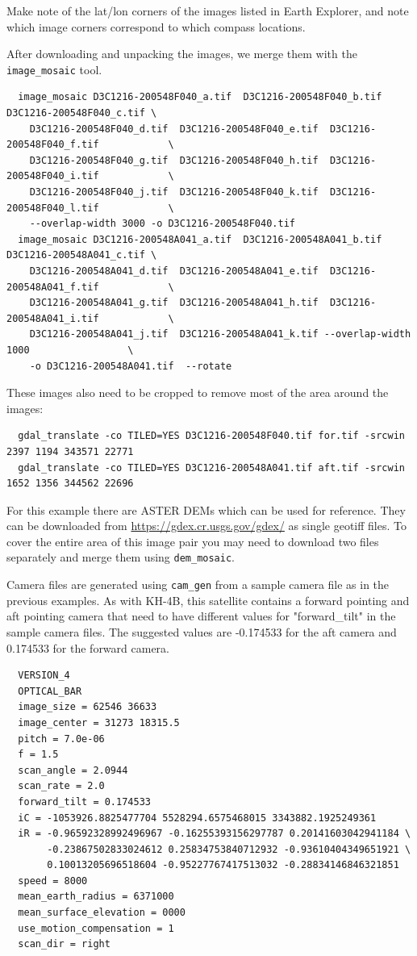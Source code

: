 Make note of the lat/lon corners of the images listed in Earth Explorer, and note which
image corners correspond to which compass locations.

After downloading and unpacking the images, we merge them with the \texttt{image\_mosaic} tool.

\begin{verbatim}
  image_mosaic D3C1216-200548F040_a.tif  D3C1216-200548F040_b.tif  D3C1216-200548F040_c.tif \
    D3C1216-200548F040_d.tif  D3C1216-200548F040_e.tif  D3C1216-200548F040_f.tif            \
    D3C1216-200548F040_g.tif  D3C1216-200548F040_h.tif  D3C1216-200548F040_i.tif            \
    D3C1216-200548F040_j.tif  D3C1216-200548F040_k.tif  D3C1216-200548F040_l.tif            \
    --overlap-width 3000 -o D3C1216-200548F040.tif
  image_mosaic D3C1216-200548A041_a.tif  D3C1216-200548A041_b.tif  D3C1216-200548A041_c.tif \
    D3C1216-200548A041_d.tif  D3C1216-200548A041_e.tif  D3C1216-200548A041_f.tif            \
    D3C1216-200548A041_g.tif  D3C1216-200548A041_h.tif  D3C1216-200548A041_i.tif            \
    D3C1216-200548A041_j.tif  D3C1216-200548A041_k.tif --overlap-width 1000                 \
    -o D3C1216-200548A041.tif  --rotate
\end{verbatim}

These images also need to be cropped to remove most of the area around the images:

\begin{verbatim}
  gdal_translate -co TILED=YES D3C1216-200548F040.tif for.tif -srcwin 2397 1194 343571 22771
  gdal_translate -co TILED=YES D3C1216-200548A041.tif aft.tif -srcwin 1652 1356 344562 22696
\end{verbatim}

For this example there are ASTER DEMs which can be used for reference.  They can be downloaded from
\url{https://gdex.cr.usgs.gov/gdex/} as single geotiff files.  To cover the entire area of this
image pair you may need to download two files separately and merge them using \texttt{dem\_mosaic}.

Camera files are generated using \texttt{cam\_gen} from a sample camera file as in the previous examples.
As with KH-4B, this satellite contains a forward pointing and aft pointing camera that need to have
different values for "forward\_tilt" in the sample camera files.  The suggested values are -0.174533
for the aft camera and 0.174533 for the forward camera.

\begin{verbatim}
  VERSION_4
  OPTICAL_BAR
  image_size = 62546 36633
  image_center = 31273 18315.5
  pitch = 7.0e-06
  f = 1.5
  scan_angle = 2.0944
  scan_rate = 2.0
  forward_tilt = 0.174533
  iC = -1053926.8825477704 5528294.6575468015 3343882.1925249361
  iR = -0.96592328992496967 -0.16255393156297787 0.20141603042941184 \
       -0.23867502833024612 0.25834753840712932 -0.93610404349651921 \
       0.10013205696518604 -0.95227767417513032 -0.28834146846321851
  speed = 8000
  mean_earth_radius = 6371000
  mean_surface_elevation = 0000
  use_motion_compensation = 1
  scan_dir = right
\end{verbatim}



